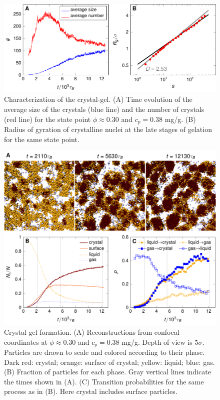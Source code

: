 \documentclass[12pt]{article}
\begin{document}
\begin{figure}[!t]
 \centering
 \includegraphics{characterisation}
\caption{Characterization of the crystal-gel. (A) Time evolution of the average size of the crystals (blue line) and the number of crystals (red line) for the state point $\phi\approx 0.30$ and $c_p=0.38$ mg/g. (B) Radius of gyration of crystalline nuclei at the late stages of gelation for the same state point.} 
 \label{fig:crystals}
\end{figure}

\clearpage 

\begin{figure}
 \centering
 \includegraphics{crystal}
 \caption{
Crystal gel formation.  
(A) Reconstructions from confocal coordinates at $\phi\approx 0.30$ and $c_p=0.38$ mg/g. Depth of view is $5\sigma$. Particles are drawn to scale and colored according to their phase. Dark red: crystal; orange: surface of crystal; yellow: liquid; blue: gas. 
(B) Fraction of particles for each phase. Gray vertical lines indicate the times shown in (A). 
(C) Transition probabilities for the same process as in (B). Here crystal includes surface particles.}
\label{fig:transitions}
\end{figure}
\end{document}
